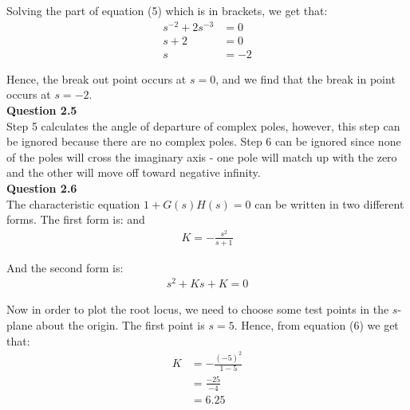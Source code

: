 \documentclass{article}
\begin{document}
   Solving the part of equation (5) which is in brackets, we get that:
   \begin{align*}
	   s^{-2} + 2s^{-3} &= 0\\
	   s + 2 &= 0\\
	   s &= -2
   \end{align*}
   
   Hence, the break out point occurs at $s = 0$, and we find that the break in point occurs at $s = -2$.\\
	
   \textbf{Question 2.5}\\
	
   Step 5 calculates the angle of departure of complex poles, however, this step can be ignored because there are no complex poles. Step 6 can be ignored since none of the poles will cross the imaginary axis - one pole will match up with the zero and the other will move off toward negative infinity.\\
	

	\textbf{Question 2.6}\\
	
	The characteristic equation $1 + G(s)H(s) = 0$ can be written in two different forms. The first form is:  and 
	\begin{align}
		K = - \frac{s^2}{s+1}
	\end{align}
	
	And the second form is:
	\begin{align}
		s^2 + Ks + K = 0
	\end{align}
	
	Now in order to plot the root locus, we need to choose some test points in the $s$-plane about the origin. The first point is $s = 5$. Hence, from equation (6) we get that:
	\begin{align*}
		K 	&= -\frac{(-5)^2}{1-5}\\
			&= \frac{-25}{-4}\\
			&= 6.25
	\end{align*}
	
\end{document}

